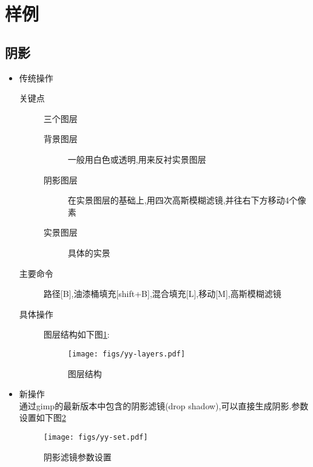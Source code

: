 \section{样例}
\subsection{阴影}\label{yl:yy}
\begin{itemize}
\item 传统操作
\begin{description}
\item[关键点] 三个图层
\begin{description}
\item[背景图层] 一般用白色或透明,用来反衬实景图层
\item[阴影图层] 在实景图层的基础上,用四次高斯模糊滤镜,并往右下方移动4个像素
\item[实景图层] 具体的实景
\end{description}
\item[主要命令] 路径[B],油漆桶填充[shift+B],混合填充[L],移动[M],高斯模糊滤镜
\item[具体操作]
图层结构如下图\ref{yl:yy:layers}:
\begin{figure}[!htbp]
	\centering
	\caption{图层结构}
    	\texttt{[image: figs/yy-layers.pdf]}
    	\label{yl:yy:layers}
\end{figure}
\end{description}
\item 新操作 \\
通过gimp的最新版本中包含的阴影滤镜(drop shadow),可以直接生成阴影.参数设置如下图\ref{yl:yy:set}
\begin{figure}[!htbp]
	\centering
	\caption{阴影滤镜参数设置}
    	\texttt{[image: figs/yy-set.pdf]}
    	\label{yl:yy:set}
\end{figure}
\end{itemize}

\clearpage

